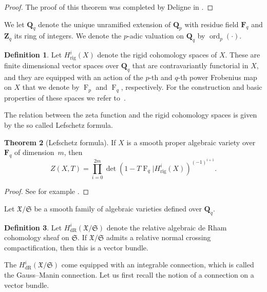 \documentclass[a4paper,11pt]{article}
\numberwithin{equation}{section}
\newcommand{\ZZ}{\mathbf{Z}} %
\newcommand{\QQ}{\mathbf{Q}} %
\newcommand{\FF}{\mathbf{F}} %
\DeclareMathOperator{\ord}{ord}          %
\DeclareMathOperator{\Frob}{F}           %
\providecommand{\HdR}{H_{\text{dR}}}    %
\providecommand{\Hrig}{H_{\text{rig}}}  %
\theoremstyle{definition}
\newtheorem{thm}{Theorem}[section]
\newtheorem{defn}[thm]{Definition}
\begin{document}
\begin{proof}
The proof of this theorem was completed by Deligne in \citep{Deligne1974}.
\end{proof}

We let $\QQ_q$ denote the unique unramified extension of $\QQ_p$ with 
residue field $\FF_q$ and $\ZZ_q$ its ring of integers. We denote
the $p$-adic valuation on $\QQ_q$ by $\ord_p(\cdot)$. 

\begin{defn}
Let $\Hrig^{i}(X)$ denote the rigid
cohomology spaces of $X$. These are finite dimensional vector spaces 
over $\QQ_q$ that are contravariantly functorial in $X$, and they are 
equipped with an action of the $p$-th and $q$-th power Frobenius map 
on $X$ that we denote by $\Frob_p$ and $\Frob_q$, respectively. For the 
construction and basic properties of these spaces we refer 
to~\citep{Berthelot1986}.
\end{defn}

The relation between the zeta function and the rigid cohomology spaces 
is given by the so called Lefschetz formula.

\begin{thm}[Lefschetz formula] \label{thm:Lefschetz}
If $X$ is a smooth proper algebraic variety over $\FF_q$ of dimension~$m$, 
then 
\[
Z(X,T) = \prod_{i=0}^{2m} \det(1- T \Frob_q | \Hrig^i(X))^{(-1)^{i+1}}.
\]
\end{thm}

\begin{proof}
See for example \citep[Theorem 6.3]{EtesseLeStum1993}.
\end{proof}

Let $\mathfrak{X}/\mathfrak{S}$ be a smooth family of algebraic varieties 
defined over $\QQ_q$.

\begin{defn}
Let $\HdR^i(\mathfrak{X}/\mathfrak{S})$ denote the relative algebraic 
de Rham cohomology sheaf on $\mathfrak{S}$. 
If $\mathfrak{X}/\mathfrak{S}$ admits a relative normal crossing 
compactification, then this is a vector bundle.
\end{defn}

The $\HdR^i(\mathfrak{X}/\mathfrak{S})$ come equipped with an integrable 
connection, which is called the Gauss--Manin connection. Let us first recall 
the notion of a connection on a vector bundle.
\end{document}
